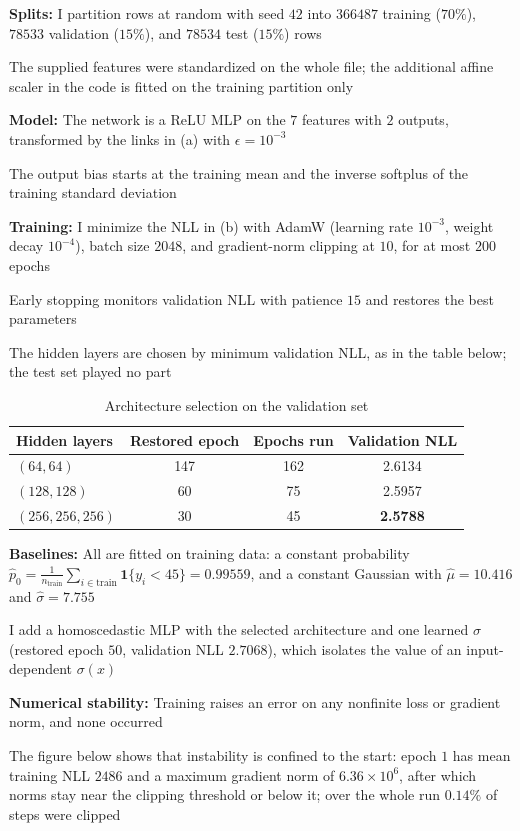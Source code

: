 \documentclass{article}
\begin{document}
\begin{enumerate}[label=\alph*.]
\textbf{Splits:} I partition rows at random with seed $42$ into $366487$ training ($70\%$), $78533$ validation ($15\%$), and $78534$ test ($15\%$) rows

The supplied features were standardized on the whole file; the additional affine scaler in the code is fitted on the training partition only

\textbf{Model:} The network is a ReLU MLP on the $7$ features with $2$ outputs, transformed by the links in (a) with $\epsilon=10^{-3}$

The output bias starts at the training mean and the inverse softplus of the training standard deviation

\textbf{Training:} I minimize the NLL in (b) with AdamW (learning rate $10^{-3}$, weight decay $10^{-4}$), batch size $2048$, and gradient-norm clipping at $10$, for at most $200$ epochs

Early stopping monitors validation NLL with patience $15$ and restores the best parameters

The hidden layers are chosen by minimum validation NLL, as in the table below; the test set played no part

\begin{table}[H]
\centering
\begin{tabular}{lccc}
\toprule
Hidden layers & Restored epoch & Epochs run & Validation NLL \\
\midrule
$(64,64)$ & 147 & 162 & 2.6134 \\
$(128,128)$ & 60 & 75 & 2.5957 \\
$(256,256,256)$ & 30 & 45 & \textbf{2.5788} \\
\bottomrule
\end{tabular}
\caption{Architecture selection on the validation set}
\end{table}

\textbf{Baselines:} All are fitted on training data: a constant probability $\hat p_0=\frac{1}{n_{\mathrm{train}}}\sum\limits_{i\in\mathrm{train}}\mathbf 1\{y_i<45\}=0.99559$, and a constant Gaussian with $\hat\mu=10.416$ and $\hat\sigma=7.755$

I add a homoscedastic MLP with the selected architecture and one learned $\sigma$ (restored epoch $50$, validation NLL $2.7068$), which isolates the value of an input-dependent $\sigma(x)$

\textbf{Numerical stability:} Training raises an error on any nonfinite loss or gradient norm, and none occurred

The figure below shows that instability is confined to the start: epoch $1$ has mean training NLL $2486$ and a maximum gradient norm of $6.36\times 10^{6}$, after which norms stay near the clipping threshold or below it; over the whole run $0.14\%$ of steps were clipped


\end{enumerate}
\end{document}
